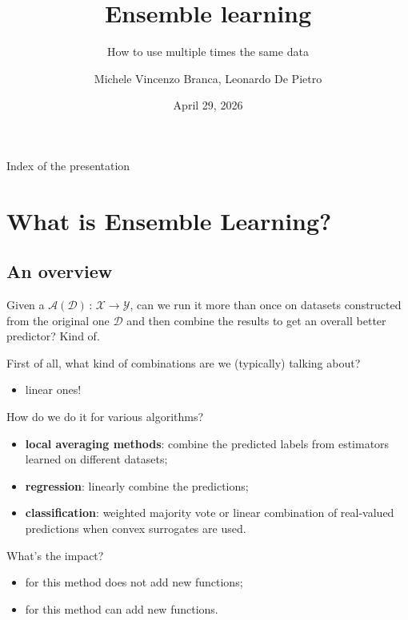 \documentclass[
11pt,notheorems,hyperref={pdfauthor=whatever}
]{beamer}
\title[
]{Ensemble learning}
\subtitle{How to use multiple times the same data}
\author[
]{
    Michele Vincenzo Branca, Leonardo De Pietro
}
\institute{
    Collegio Carlo Alberto, \\
    University of Turin}
\date{April 29, 2026}
\begin{document}
{
\begin{frame}
  \titlepage
\end{frame}
}
\addtocounter{framenumber}{-1}

\begin{frame}{Index of the presentation}
    \tableofcontents[part=1, hideallsubsections]
    \tableofcontents[part=2, hideallsubsections]
    \tableofcontents[part=3, hideallsubsections]
\end{frame}

\justifying
\section{What is Ensemble Learning?}
\subsection{An overview}
\begin{frame}
    Given a  \(\mathcal{A}(\mathcal{D})\,:\,\mathcal{X}\to\mathcal{Y}\), can we run it more than once on datasets constructed from the original one \(\mathcal{D}\) and then combine the results to get an overall better predictor? Kind of.
    
    First of all, what kind of combinations are we (typically) talking about?
    \begin{itemize}
        \item linear ones!
    \end{itemize}
    How do we do it for various algorithms?
    \begin{itemize}
        \item \alert{\textbf{local averaging methods}}: combine the predicted labels from estimators learned on different datasets;
        \item \alert{\textbf{regression}}: linearly combine the predictions;
        \item \alert{\textbf{classification}}: weighted majority vote or linear combination of real-valued predictions when convex surrogates are used.
    \end{itemize}
    What's the impact?
    \begin{itemize}
    \item for  this method does not add new functions;
    \item for  this method can add new functions. 
\end{itemize}
\end{frame}
\end{document}
